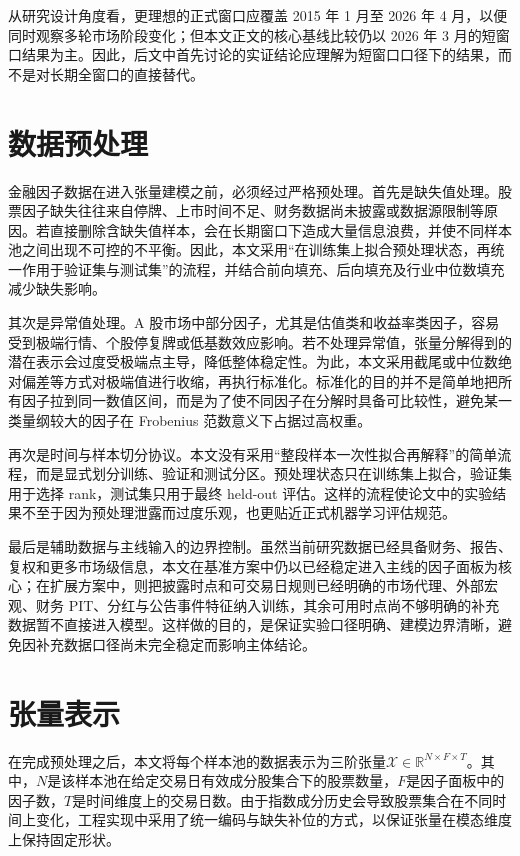 从研究设计角度看，更理想的正式窗口应覆盖 2015 年 1 月至 2026 年 4 月，以便同时观察多轮市场阶段变化；但本文正文的核心基线比较仍以 2026 年 3 月的短窗口结果为主。因此，后文中首先讨论的实证结论应理解为短窗口口径下的结果，而不是对长期全窗口的直接替代。

\section{数据预处理}

金融因子数据在进入张量建模之前，必须经过严格预处理。首先是缺失值处理。股票因子缺失往往来自停牌、上市时间不足、财务数据尚未披露或数据源限制等原因。若直接删除含缺失值样本，会在长期窗口下造成大量信息浪费，并使不同样本池之间出现不可控的不平衡。因此，本文采用“在训练集上拟合预处理状态，再统一作用于验证集与测试集”的流程，并结合前向填充、后向填充及行业中位数填充减少缺失影响。

其次是异常值处理。A 股市场中部分因子，尤其是估值类和收益率类因子，容易受到极端行情、个股停复牌或低基数效应影响。若不处理异常值，张量分解得到的潜在表示会过度受极端点主导，降低整体稳定性。为此，本文采用截尾或中位数绝对偏差等方式对极端值进行收缩，再执行标准化。标准化的目的并不是简单地把所有因子拉到同一数值区间，而是为了使不同因子在分解时具备可比较性，避免某一类量纲较大的因子在 Frobenius 范数意义下占据过高权重。

再次是时间与样本切分协议。本文没有采用“整段样本一次性拟合再解释”的简单流程，而是显式划分训练、验证和测试分区。预处理状态只在训练集上拟合，验证集用于选择 rank，测试集只用于最终 held-out 评估。这样的流程使论文中的实验结果不至于因为预处理泄露而过度乐观，也更贴近正式机器学习评估规范。

最后是辅助数据与主线输入的边界控制。虽然当前研究数据已经具备财务、报告、复权和更多市场级信息，本文在基准方案中仍以已经稳定进入主线的因子面板为核心；在扩展方案中，则把披露时点和可交易日规则已经明确的市场代理、外部宏观、财务 PIT、分红与公告事件特征纳入训练，其余可用时点尚不够明确的补充数据暂不直接进入模型。这样做的目的，是保证实验口径明确、建模边界清晰，避免因补充数据口径尚未完全稳定而影响主体结论。

\section{张量表示}

在完成预处理之后，本文将每个样本池的数据表示为三阶张量$\mathcal{X}\in\mathbb{R}^{N\times F\times T}$。其中，$N$是该样本池在给定交易日有效成分股集合下的股票数量，$F$是因子面板中的因子数，$T$是时间维度上的交易日数。由于指数成分历史会导致股票集合在不同时间上变化，工程实现中采用了统一编码与缺失补位的方式，以保证张量在模态维度上保持固定形状。

